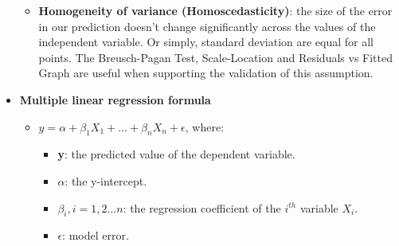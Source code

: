 \documentclass[a4paper]{article}
\begin{document}
\begin{itemize}
\begin{itemize}
        \item[] \textbf{Homogeneity of variance (Homoscedasticity)}: the size of the error in our prediction doesn’t change significantly across the values of the independent variable. Or simply, standard deviation are equal for all points. The Breusch-Pagan Test, Scale-Location and Residuals vs Fitted Graph are useful when supporting the validation of this assumption.
    \end{itemize}
    
    \item[] \textbf{Multiple linear regression formula}
    \begin{itemize}
        \centering
        \large
        \item[] $y=\alpha + \beta_1X_1 + ...+ \beta_nX_n + \epsilon$, where:
        \begin{itemize}
            \item[] \textbf{y}: the predicted value of the dependent variable.
            
            \item[] \textbf{$\alpha$}: the y-intercept.
            
            \item[] \textbf{$\beta_i, i=1,2...n$}: the regression coefficient of the $i^{th}$ variable $X_i$.
            
            \item[] \textbf{$\epsilon$}: model error.
        \end{itemize}
    \end{itemize}

\end{itemize}
\end{document}
